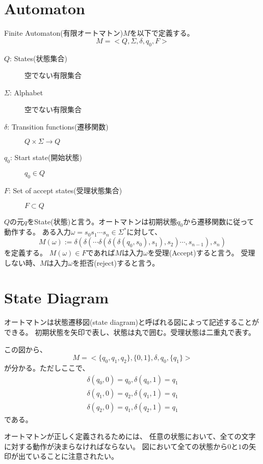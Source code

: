 \documentclass[b5paper,fleqn]{ltjsarticle}
\newcommand\al[1]{\begin{align*}#1\end{align*}}
\begin{document}
\section{Automaton}
Finite Automaton(有限オートマトン)$M$を以下で定義する。
\[M=<Q,\Sigma,\delta,q_0,F>\]
\begin{description}
\item[$Q$: States(状態集合)] 空でない有限集合
\item[$\Sigma$: Alphabet] 空でない有限集合
\item[$\delta$: Transition functions(遷移関数)] $Q\times\Sigma\rightarrow Q$
\item[$q_0$: Start state(開始状態)] $q_0\in Q$
\item[$F$: Set of accept states(受理状態集合)] $F\subset Q$
\end{description}
$Q$の元$q$をState(状態)と言う。オートマトンは初期状態$q_0$から遷移関数に従って動作する。
ある入力$\omega=s_0s_1\cdots s_n\in\Sigma^*$に対して、
\[M(\omega):=\delta(\delta(\cdots\delta(\delta(\delta(q_0,s_0),s_1),s_2)\cdots,s_{n-1}),s_n)\]を定義する。
$M(\omega)\in F$であれば$M$は入力$\omega$を受理(Accept)すると言う。
受理しない時、$M$は入力$\omega$を拒否(reject)すると言う。

\section{State Diagram}
オートマトンは状態遷移図(state diagram)と呼ばれる図によって記述することができる。
初期状態を矢印で表し、状態は丸で囲む。受理状態は二重丸で表す。
\vskip10pt
\vskip5pt
この図から、
\[M=<\{q_0,q_1,q_2\},\{0,1\},\delta,q_0,\{q_1\}>\]
が分かる。ただしここで、
\al{\delta(q_0,0)=q_0, \delta(q_0,1)=q_1\\
\delta(q_1,0)=q_2, \delta(q_1,1)=q_1\\
\delta(q_2,0)=q_1, \delta(q_2,1)=q_1
}である。\par
オートマトンが正しく定義されるためには、
任意の状態において、全ての文字に対する動作が決まらなければならない。
図において全ての状態から$0$と$1$の矢印が出ていることに注意されたい。
\end{document}
